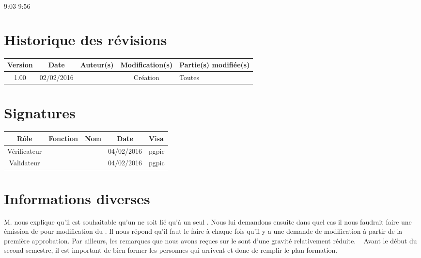 \documentclass [a4paper] {article}
\begin{document}
\rhead{}
\hfill   
\hfill 	9:03-9:56 				%



\section*{Historique des révisions}
\begin{center}
			\begin{tabular}{| c | c | c | c | p{4cm} |}
				\hline
				\rowcolor{Gray}
				Version & Date & Auteur(s) & Modification(s) & Partie(s) modifiée(s)		 \\
				\hline
				1.00 & 02/02/2016 & \Pierre & Création & Toutes \\
		\hline		
			\end{tabular}
		\end{center}

\section*{Signatures}

		\begin{center}
			\begin{tabular}{| c | c | c | c | p{4cm} |}
				\hline
				\rowcolor{Gray}
				Rôle & Fonction & Nom & Date & Visa		 \\
				\hline
				Vérificateur & \RQA & \Kafui & 04/02/2016 & pgpic \\[30pt]
				\hline
				Validateur & \CP & \Sergi & 04/02/2016 & pgpic \\[30pt]	
				\hline
			\end{tabular}
		\end{center}


\section{Informations diverses}
M. \nomTuteurQualite{} nous explique qu'il est souhaitable qu'un \OC{} ne soit lié qu'à un seul \FT{}. Nous lui demandons ensuite dans quel cas il nous faudrait faire une émission de \FFT{} pour modification du \PQ{}. Il nous répond qu'il faut le faire à chaque fois qu'il y a une demande de modification à partir de la première approbation. Par ailleurs, les remarques que nous avons reçues sur le \PQCourt{} sont d'une gravité relativement réduite.
~
Avant le début du second semestre, il est important de bien former les personnes qui arrivent et donc de remplir le plan formation.
\end{document}

